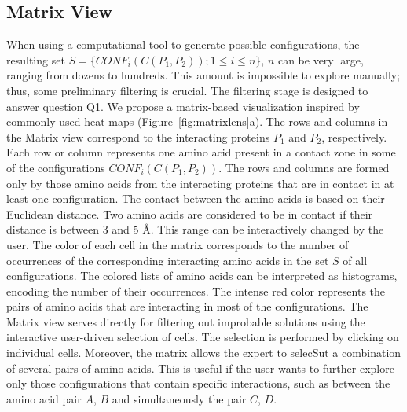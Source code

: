 \documentclass{bmcart}
\def\MatView {Matrix view\xspace}
\begin{document}

\subsection*{Matrix View}
\label{sec:matview}
When using a computational tool to generate possible configurations, the resulting set $S = \{CONF_i(C(P_1,P_2)); 1 \leq i \leq n\}$, $n$ can be very large, ranging from dozens to hundreds. 
This amount is impossible to explore manually; thus, some preliminary filtering is crucial.
The filtering stage is designed to answer question Q1.
We propose a matrix-based visualization inspired by commonly used heat maps (Figure~\ref{fig:matrixlens}a).
The rows and columns in the \MatView correspond to the interacting proteins $P_1$ and $P_2$, respectively.
Each row or column represents one amino acid present in a contact zone in some of the configurations $CONF_i(C(P_1,P_2))$. 
The rows and columns are formed only by those amino acids from the interacting proteins that are in contact in at least one configuration.
The contact between the amino acids is based on their Euclidean distance. 
Two amino acids are considered to be in contact if their distance is between 3 and 5 \AA.
This range can be interactively changed by the user.
The color of each cell in the matrix corresponds to the number of occurrences of the corresponding interacting amino acids in the set $S$ of all configurations. 
The colored lists of amino acids can be interpreted as histograms, encoding the number of their occurrences.
The intense red color represents the pairs of amino acids that are interacting in most of the configurations.
The \MatView serves directly for filtering out improbable solutions using the interactive user-driven selection of cells.
The selection is performed by clicking on individual cells. 
Moreover, the matrix allows the expert to selecSut a combination of several pairs of amino acids.
This is useful if the user wants to further explore only those configurations that contain specific interactions, such as between the amino acid pair $A$, $B$ and simultaneously the pair $C$, $D$. 

\end{document}
